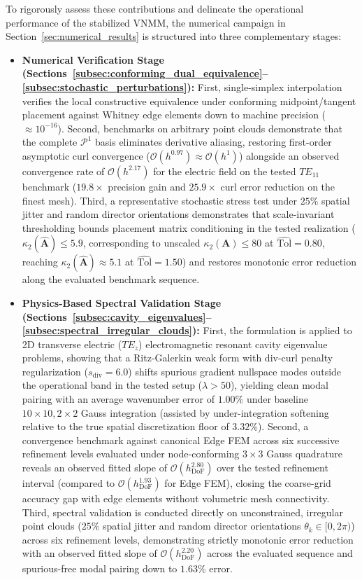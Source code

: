 \documentclass[preprint,12pt]{elsarticle}
\begin{document}
To rigorously assess these contributions and delineate the operational performance of the stabilized VNMM, the numerical campaign in Section~\ref{sec:numerical_results} is structured into three complementary stages:
\begin{itemize}
    \item \textbf{Numerical Verification Stage (Sections~\ref{subsec:conforming_dual_equivalence}--\ref{subsec:stochastic_perturbations}):} 
    First, single-simplex interpolation verifies the local constructive equivalence under conforming midpoint/tangent placement against Whitney edge elements down to machine precision ($\approx 10^{-16}$). Second, benchmarks on arbitrary point clouds demonstrate that the complete $\mathcal{P}^1$ basis eliminates derivative aliasing, restoring first-order asymptotic curl convergence ($\mathcal{O}(h^{0.97}) \approx \mathcal{O}(h^1)$) alongside an observed convergence rate of $\mathcal{O}(h^{2.17})$ for the electric field on the tested $TE_{11}$ benchmark ($19.8\times$ precision gain and $25.9\times$ curl error reduction on the finest mesh). Third, a representative stochastic stress test under $25\%$ spatial jitter and random director orientations demonstrates that scale-invariant thresholding bounds placement matrix conditioning in the tested realization ($\kappa_2(\widehat{\mathbf{A}}) \le 5.9$, corresponding to unscaled $\kappa_2(\mathbf{A}) \le 80$ at $\widehat{\mathrm{Tol}} = 0.80$, reaching $\kappa_2(\widehat{\mathbf{A}}) \approx 5.1$ at $\widehat{\mathrm{Tol}} = 1.50$) and restores monotonic error reduction along the evaluated benchmark sequence.

    \item \textbf{Physics-Based Spectral Validation Stage (Sections~\ref{subsec:cavity_eigenvalues}--\ref{subsec:spectral_irregular_clouds}):} 
    First, the formulation is applied to 2D transverse electric ($TE_z$) electromagnetic resonant cavity eigenvalue problems, showing that a Ritz-Galerkin weak form with div-curl penalty regularization ($s_{\mathrm{div}} = 6.0$) shifts spurious gradient nullspace modes outside the operational band in the tested setup ($\lambda > 50$), yielding clean modal pairing with an average wavenumber error of $1.00\%$ under baseline $10 \times 10, 2 \times 2$ Gauss integration (assisted by under-integration softening relative to the true spatial discretization floor of $3.32\%$). Second, a convergence benchmark against canonical Edge FEM across six successive refinement levels evaluated under node-conforming $3 \times 3$ Gauss quadrature reveals an observed fitted slope of $\mathcal{O}(h_{\mathrm{DoF}}^{2.80})$ over the tested refinement interval (compared to $\mathcal{O}(h_{\mathrm{DoF}}^{1.93})$ for Edge FEM), closing the coarse-grid accuracy gap with edge elements without volumetric mesh connectivity. Third, spectral validation is conducted directly on unconstrained, irregular point clouds ($25\%$ spatial jitter and random director orientations $\theta_k \in [0, 2\pi)$) across six refinement levels, demonstrating strictly monotonic error reduction with an observed fitted slope of $\mathcal{O}(h_{\mathrm{DoF}}^{2.20})$ across the evaluated sequence and spurious-free modal pairing down to $1.63\%$ error.


\end{itemize}
\end{document}
